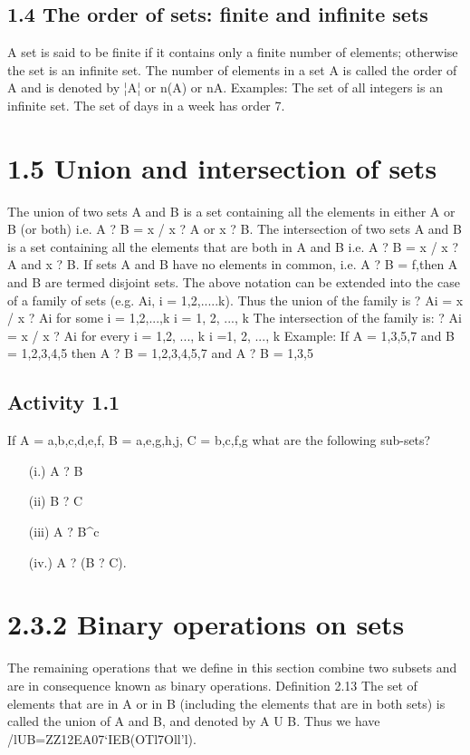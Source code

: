 {{{%
\subsection{1.4 The order of sets: finite and infinite sets}
A set is said to be finite if it contains only a finite number of elements;
otherwise the set is an infinite set. The number of elements in a set A is
called the order of A and is denoted by ¦A¦ or n(A) or nA.
Examples:
The set of all integers is an infinite set.
The set of days in a week has order 7.

\section{1.5 Union and intersection of sets}
The union of two sets A and B is a set containing all the elements in
either A or B (or both)
i.e. A ? B = {x / x ? A or x ? B}.
The intersection of two sets A and B is a set containing all the elements
that are both in A and B
i.e. A ? B = {x / x ? A and x ? B}.
If sets A and B have no elements in common, i.e. A ? B = f,then A and B
are termed disjoint sets.
The above notation can be extended into the case of a family of sets (e.g.
Ai, i = 1,2,.....k). Thus the union of the family is
? Ai = {x / x ? Ai for some i = 1,2,...,k}
i = 1, 2, ..., k
The intersection of the family is:
? Ai = {x / x ? Ai for every i = 1,2, ..., k}
i =1, 2, ..., k
Example:
If A = {1,3,5,7} and B = {1,2,3,4,5} then A ? B = {1,2,3,4,5,7} and
A ? B = {1,3,5}
\subsection{Activity 1.1}
\smallskip If A = {a,b,c,d,e,f}, B = {a,e,g,h,j}, C = {b,c,f,g} what are the following sub-sets?
\begin{itemize}
\item[(i.)] A ? B
\item[(ii)] B ? C
\item[(iii)] A ? B^c
\item[(iv.)] A ? (B ? C).
\end{itemize}
\smallskip 
\section{2.3.2 Binary operations on sets}
The remaining operations that we deﬁne in this section combine two subsets and are in consequence
known as binary operations.
Deﬁnition 2.13 The set of elements that are in A or in B (including the elements that are in
both sets) is called the union of A and B, and denoted by A U B. Thus we have
/lUB={ZZ12EA07‘IEB(OTl7Oll'l)}.

}}}
